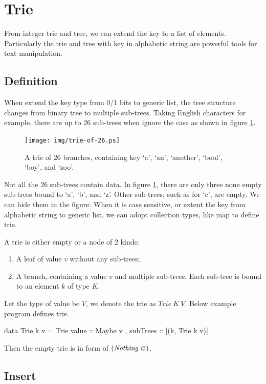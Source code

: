 \documentclass[b5paper]{article}
\begin{document}
\section{Trie}
From integer trie and tree, we can extend the key to a list of elements. Particularly the trie and tree with key in alphabetic string are powerful tools for text manipulation.

\subsection{Definition}
When extend the key type from 0/1 bits to generic list, the tree structure changes from binary tree to multiple sub-trees. Taking English characters for example, there are up to 26 sub-trees when ignore the case as shown in figure \ref{fig:trie-of-26}.

\begin{figure}[htbp]
  \centering
  \texttt{[image: img/trie-of-26.ps]}
  \caption{A trie of 26 branches, containing key `a', `an', `another', `bool', `boy', and `zoo'.}
  \label{fig:trie-of-26}
\end{figure}

Not all the 26 sub-trees contain data. In figure \ref{fig:trie-of-26}, there are only three none empty sub-trees bound to `a', `b', and `z'. Other sub-trees, such as for `c', are empty. We can hide them in the figure. When it is case sensitive, or extent the key from alphabetic string to generic list, we can adopt collection types, like map to define trie.

A trie is either empty or a node of 2 kinds:

\begin{enumerate}
\item A leaf of value $v$ without any sub-trees;
\item A branch, containing a value $v$ and multiple sub-trees. Each sub-tree is bound to an element $k$ of type $K$.
\end{enumerate}

Let the type of value be $V$, we denote the trie as $Trie\ K\ V$. Below example program defines trie.

\begin{Haskell}
data Trie k v = Trie { value :: Maybe v
                     , subTrees :: [(k, Trie k v)]}
\end{Haskell}

Then the empty trie is in form of $(\textit{Nothing}\ \varnothing)$.

\subsection{Insert}
\end{document}
